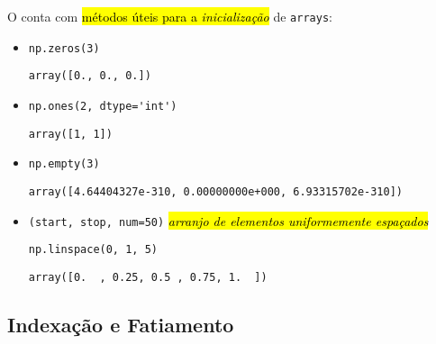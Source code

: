 O {\numpy} conta com \hl{métodos úteis para a \emph{inicialização}} de \texttt{arrays}:
\begin{itemize}
\item {\PYTHONnumpyDOTzeros} 

\begin{lstlisting}[xrightmargin=2.5em]
np.zeros(3)
\end{lstlisting}

\begin{verbatim}
array([0., 0., 0.])
\end{verbatim}

\item {\PYTHONnumpyDOTones} 

\begin{lstlisting}[xrightmargin=2.5em]
np.ones(2, dtype='int')
\end{lstlisting}

\begin{verbatim}
array([1, 1])
\end{verbatim}

\item {\PYTHONnumpyDOTempty} 

\begin{lstlisting}[xrightmargin=2.5em]
np.empty(3)
\end{lstlisting}

\begin{verbatim}
array([4.64404327e-310, 0.00000000e+000, 6.93315702e-310])
\end{verbatim}

\item {\PYTHONnumpyDOTlinspace}\texttt{(start, stop, num=50)} \emph{\hl{arranjo de elementos uniformemente espaçados}}

\begin{lstlisting}[xrightmargin=2.5em]
np.linspace(0, 1, 5)
\end{lstlisting}

\begin{verbatim}
array([0.  , 0.25, 0.5 , 0.75, 1.  ])
\end{verbatim}

\end{itemize}

\subsection{Indexação e Fatiamento}\label{cap_arr_sec_arr:ssec:islice}

